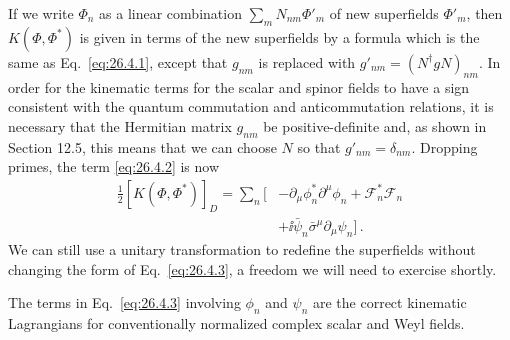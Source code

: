 If we write \(\Phi_n\) as a linear combination
\(\sum_mN_{nm}\Phi'_m\) of new superfields \(\Phi'_m\), then
\(K(\Phi,\Phi^*)\) is given in terms of the new superfields by a formula which
is the same as Eq.~\eqref{eq:26.4.1}, except that \(g_{nm}\) is replaced with
\(g'_{nm}=(N^\dagger gN)_{nm}\). In order for the kinematic terms for the
scalar and spinor fields to have a sign consistent with the quantum
commutation and anticommutation relations, it is necessary that the Hermitian
matrix \(g_{nm}\) be positive-definite and, as shown in Section 12.5, this
means that we can choose \(N\) so that \(g'_{nm}=\delta_{nm}\). Dropping
primes, the term \eqref{eq:26.4.2} is now
\begin{equation}
  \begin{aligned}
  \frac12[K(\Phi,\Phi^*)]_D
  =\sum_n\biggl[
    &-\partial_\mu\phi_n^*\partial^\mu\phi_n
    +\mathcal{F}_n^*\mathcal{F}_n
  \\
    &+\ii\bar\psi_n\bar\sigma^\mu\partial_\mu\psi_n
  \biggr]\,.
  \end{aligned}
  \tag{26.4.3}\label{eq:26.4.3}
\end{equation}
We can still use a unitary transformation to redefine the superfields without
changing the form of Eq.~\eqref{eq:26.4.3}, a freedom we will need to exercise
shortly.

The terms in Eq.~\eqref{eq:26.4.3} involving \(\phi_n\) and \(\psi_n\) are
the correct kinematic Lagrangians for conventionally normalized complex scalar
and Weyl fields.

